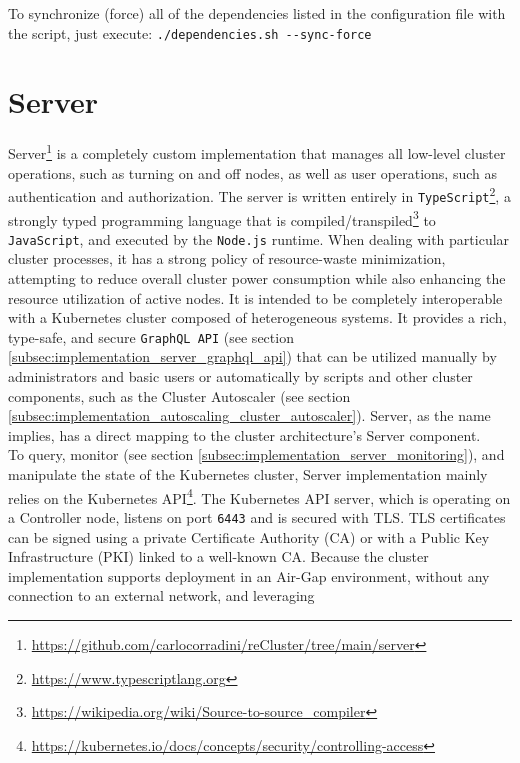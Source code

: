 To synchronize (force) all of the dependencies listed in the configuration file
with the script, just execute: \lstinline[language=shell, alsoletter={.-},
morekeywords={[2]{dependencies.sh}}, morekeywords={[3]{--sync-force}}]{./dependencies.sh --sync-force}

\section{Server}
\label{sec:implementation_server}

Server\footnote{\url{https://github.com/carlocorradini/reCluster/tree/main/server}}
is a completely custom implementation that manages all low-level cluster operations,
such as turning on and off nodes, as well as user operations, such as
authentication and authorization. The server is written entirely in \texttt{TypeScript}\footnote{\url{https://www.typescriptlang.org}},
a strongly typed programming language that is compiled/transpiled\footnote{\url{https://wikipedia.org/wiki/Source-to-source_compiler}}
to \texttt{JavaScript}, and executed by the \texttt{Node.js} runtime. When dealing
with particular cluster processes, it has a strong policy of resource-waste
minimization, attempting to reduce overall cluster power consumption while also enhancing
the resource utilization of active nodes. It is intended to be completely
interoperable with a Kubernetes cluster composed of heterogeneous systems. It provides
a rich, type-safe, and secure \texttt{GraphQL API} (see section \ref{subsec:implementation_server_graphql_api})
that can be utilized manually by administrators and basic users or automatically
by scripts and other cluster components, such as the Cluster Autoscaler (see
section \ref{subsec:implementation_autoscaling_cluster_autoscaler}). Server, as the
name implies, has a direct mapping to the cluster architecture's Server
component. \\ %
To query, monitor (see section \ref{subsec:implementation_server_monitoring}),
and manipulate the state of the Kubernetes cluster, Server implementation mainly
relies on the Kubernetes API\footnote{\url{https://kubernetes.io/docs/concepts/security/controlling-access}}.
The Kubernetes API server, which is operating on a Controller node, listens on
port \texttt{6443} and is secured with TLS. TLS certificates can be signed using
a private Certificate Authority (CA) or with a Public Key Infrastructure (PKI)
linked to a well-known CA. Because the cluster implementation supports deployment
in an Air-Gap environment, without any connection to an external network, and leveraging
